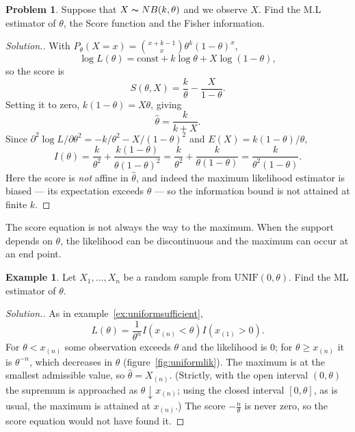 \documentclass[12pt,a4paper]{report}
\theoremstyle{definition}
\newtheorem{exa}[thm]{Example}
\newtheorem{problemx}{Problem}[section]
\newenvironment{problem}{\begin{problemx}}{\end{problemx}}
\newenvironment{solution}
  {\renewcommand{\qedsymbol}{}\begin{proof}[\textit{Solution}.]}
  {\end{proof}}
\begin{document}
\begin{problem}
Suppose that $X\thicksim NB(k,\theta)$ and we observe $X$. Find the M.L estimator of $\theta$, the Score function and the Fisher information.
\end{problem}

\begin{solution}
With $P_{\theta}(X=x)=\binom{x+k-1}{x}\theta^{k}(1-\theta)^{x}$,
\[\log L(\theta) = \text{const} + k\log\theta + X\log(1-\theta),\]
so the score is
\[S(\theta,X) = \frac{k}{\theta} - \frac{X}{1-\theta} .\]
Setting it to zero, $k(1-\theta)=X\theta$, giving
\[\widehat{\theta} = \frac{k}{k+X}.\]
Since $\partial^{2}\log L/\partial\theta^{2} = -k/\theta^{2} - X/(1-\theta)^{2}$
and $E(X)=k(1-\theta)/\theta$,
\[I(\theta) = \frac{k}{\theta^{2}} + \frac{k(1-\theta)}{\theta(1-\theta)^{2}}
= \frac{k}{\theta^{2}} + \frac{k}{\theta(1-\theta)}
= \frac{k}{\theta^{2}(1-\theta)} .\]
Here the score is \emph{not} affine in $\widehat{\theta}$, and indeed the
maximum likelihood estimator is biased --- its expectation exceeds $\theta$ ---
so the information bound is not attained at finite $k$.
\end{solution}

The score equation is not always the way to the maximum. When the support depends
on $\theta$, the likelihood can be discontinuous and the maximum can occur at an
end point.

\begin{exa}
\label{ex:uniformmle}
Let $X_1, \dots, X_n$ be a random sample from $\text{UNIF}(0, \theta)$. Find the ML
estimator of $\theta$.
\end{exa}

\begin{solution}
As in example~\ref{ex:uniformsufficient},
\[L(\theta) = \frac{1}{\theta^n}I\left(x_{(n)}<\theta\right)I\left(x_{(1)}>0\right).\]
For $\theta<x_{(n)}$ some observation exceeds $\theta$ and the likelihood is $0$;
for $\theta\ge x_{(n)}$ it is $\theta^{-n}$, which decreases in $\theta$
(figure~\ref{fig:uniformlik}). The maximum is at the smallest admissible value, so
$\hat\theta = X_{(n)}$. (Strictly, with the open interval $(0, \theta)$ the supremum is
approached as $\theta\downarrow x_{(n)}$; using the closed interval $[0, \theta]$, as is
usual, the maximum is attained at $x_{(n)}$.) The score $-\frac n\theta$ is never zero,
so the score equation would not have found it.
\end{solution}
\end{document}
